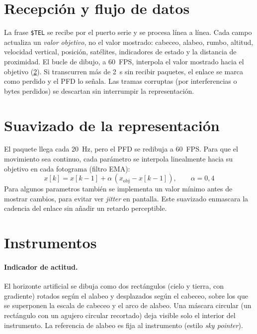 \section{Recepción y flujo de datos}
\label{sec:sw_recepcion}

La frase \texttt{\$TEL} se recibe por el puerto serie y se procesa línea a
línea. Cada campo actualiza un \emph{valor objetivo}, no el valor mostrado:
cabeceo, alabeo, rumbo, altitud, velocidad vertical, posición, satélites,
indicadores de estado y la distancia de proximidad. El bucle de dibujo, a
\SI{60}{FPS}, interpola el valor mostrado hacia el objetivo
(\cref{sec:sw_suavizado}). Si transcurren más de \SI{2}{\second} sin recibir
paquetes, el enlace se marca como perdido y el PFD lo señala. Las tramas
corruptas (por interferencias o bytes perdidos) se descartan sin interrumpir la
representación.


\section{Suavizado de la representación}
\label{sec:sw_suavizado}

El paquete llega cada \SI{20}{\hertz}, pero el PFD se redibuja a \SI{60}{FPS}. Para
que el movimiento sea continuo, cada parámetro se interpola linealmente hacia su
objetivo en cada fotograma (filtro EMA):
\begin{equation}
    x[k] = x[k-1] + \alpha\,(x_{\text{obj}} - x[k-1]), \qquad \alpha = 0{,}4
\end{equation}
 Para algunos parametros también se implementa un valor mínimo antes de mostrar cambios, para evitar ver \textit{jitter} en pantalla. Este suavizado enmascara la cadencia del enlace sin añadir un retardo perceptible.


\section{Instrumentos}
\label{sec:sw_instrumentos}

\paragraph{Indicador de actitud.}
El horizonte artificial se dibuja como dos rectángulos (cielo y tierra, con
gradiente) rotados según el alabeo y desplazados según el cabeceo, sobre los que
se superponen la escala de cabeceo y el arco de alabeo. Una máscara circular (un
rectángulo con un agujero circular recortado) deja visible solo el interior del
instrumento. La referencia de alabeo es fija al instrumento (estilo
\textit{sky pointer}).

